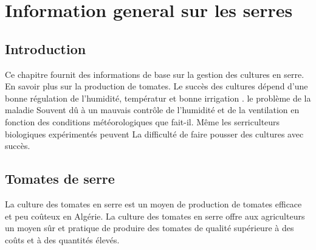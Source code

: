 \chapter{Information general sur les serres } \label{chap:Information general sur les serres}

\section*{Introduction}
Ce chapitre fournit des informations de base sur la gestion des cultures en serre.
En savoir plus sur la production de tomates. 
Le succès des cultures dépend d'une bonne régulation de l'humidité,
 températur et bonne irrigation . le problème de la maladie 
 Souvent dû à un mauvais contrôle de l'humidité et de la ventilation en fonction des conditions météorologiques 
 que fait-il. Même les serriculteurs biologiques expérimentés peuvent 
 La difficulté de faire pousser des cultures avec succès.
 \\
\section{Tomates de serre }
La culture des tomates en serre est un moyen de production de tomates efficace et peu coûteux en Algérie. La culture des tomates en serre offre aux agriculteurs un moyen sûr et pratique de produire des tomates de qualité supérieure à des coûts et à des quantités élevés.
